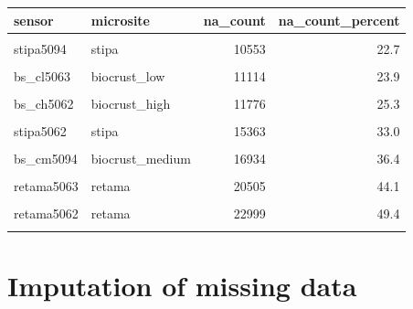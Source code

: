 \documentclass[]{article}
\begin{document}
\begin{table}[H]
\centering
\begin{tabular}[t]{l|l|r|r}
\hline
sensor & microsite & na\_count & na\_count\_percent\\
\hline
\cellcolor{gray!6}{bs\_ch5094} & \cellcolor{gray!6}{biocrust\_high} & \cellcolor{gray!6}{7674} & \cellcolor{gray!6}{16.5}\\
\hline
stipa5094 & stipa & 10553 & 22.7\\
\hline
\cellcolor{gray!6}{bs\_cl5094} & \cellcolor{gray!6}{biocrust\_low} & \cellcolor{gray!6}{10987} & \cellcolor{gray!6}{23.6}\\
\hline
bs\_cl5063 & biocrust\_low & 11114 & 23.9\\
\hline
\cellcolor{gray!6}{bs\_cl5062} & \cellcolor{gray!6}{biocrust\_low} & \cellcolor{gray!6}{11188} & \cellcolor{gray!6}{24.1}\\
\hline
bs\_ch5062 & biocrust\_high & 11776 & 25.3\\
\hline
\cellcolor{gray!6}{bs\_ch5063} & \cellcolor{gray!6}{biocrust\_high} & \cellcolor{gray!6}{14125} & \cellcolor{gray!6}{30.4}\\
\hline
stipa5062 & stipa & 15363 & 33.0\\
\hline
\cellcolor{gray!6}{stipa5063} & \cellcolor{gray!6}{stipa} & \cellcolor{gray!6}{15604} & \cellcolor{gray!6}{33.5}\\
\hline
bs\_cm5094 & biocrust\_medium & 16934 & 36.4\\
\hline
\cellcolor{gray!6}{bs\_cm5062} & \cellcolor{gray!6}{biocrust\_medium} & \cellcolor{gray!6}{18743} & \cellcolor{gray!6}{40.3}\\
\hline
retama5063 & retama & 20505 & 44.1\\
\hline
\cellcolor{gray!6}{retama5094} & \cellcolor{gray!6}{retama} & \cellcolor{gray!6}{22840} & \cellcolor{gray!6}{49.1}\\
\hline
retama5062 & retama & 22999 & 49.4\\
\hline
\cellcolor{gray!6}{bs\_cm5063} & \cellcolor{gray!6}{biocrust\_medium} & \cellcolor{gray!6}{31225} & \cellcolor{gray!6}{67.1}\\
\hline
\end{tabular}
\end{table}

\hypertarget{imputation-of-missing-data}{%
\section{Imputation of missing data}\label{imputation-of-missing-data}}
\end{document}
